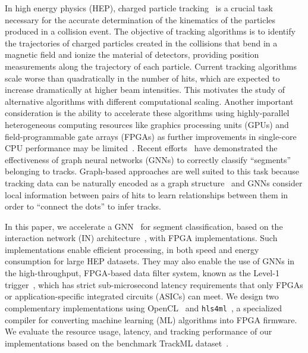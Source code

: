 \documentclass{article}
\newcommand{\hlsfml}{\texttt{hls4ml}\xspace}
\begin{document}
In high energy physics (HEP), charged particle tracking~\cite{Amrouche:2019wmx,Strandlie:2010zz} is a crucial task necessary for the accurate determination of the kinematics of the particles produced in a collision event.
The objective of tracking algorithms is to identify the trajectories of charged particles created in the collisions that bend in a magnetic field and ionize the material of detectors, providing position measurements along the trajectory of each particle.
Current tracking algorithms~\cite{Chatrchyan:2014fea,Aaboud:2017all,combkalman1,combkalman2,combkalman3,kalman} scale worse than quadratically in the number of hits, which are expected to increase dramatically at higher beam intensities. %
This motivates the study of alternative algorithms with different computational scaling. 
Another important consideration is the ability to accelerate these algorithms using highly-parallel heterogeneous computing resources like graphics processing units (GPUs) and field-programmable gate arrays (FPGAs) as further improvements in single-core CPU performance may be limited~\cite{breakdown,dennard}.
Recent efforts~\cite{Farrell:2018cjr,Ju:2020xty} have demonstrated the effectiveness of graph neural networks (GNNs) to correctly classify ``segments'' belonging to tracks.
Graph-based approaches are well suited to this task because tracking data can be naturally encoded as a graph structure~\cite{Shlomi:2020gdn} and GNNs consider local information between pairs of hits to learn relationships between them in order to ``connect the dots'' to infer tracks.

In this paper, we accelerate a GNN~\cite{Ju:2020xty} for segment classification, based on the interaction network (IN) architecture~\cite{Battaglia:2016jem,battaglia2018relational}, with FPGA implementations. 
Such implementations enable efficient processing, in both speed and energy consumption for large HEP datasets.
They may also enable the use of GNNs in the high-throughput, FPGA-based data filter system, known as the Level-1 trigger~\cite{ATLASL1T,ATLASP2L1T,CMSL1T,CMSP2L1T}, which has strict sub-microsecond latency requirements that only FPGAs or application-specific integrated circuits (ASICs) can meet.
We design two complementary implementations using OpenCL~\cite{OpenCL} and \hlsfml~\cite{Duarte:2018ite,vloncar_2020_4161550}, a specialized compiler for converting machine learning (ML) algorithms into FPGA firmware.
We evaluate the resource usage, latency, and tracking performance of our implementations based on the benchmark TrackML dataset~\cite{Amrouche:2019wmx}.
\end{document}
